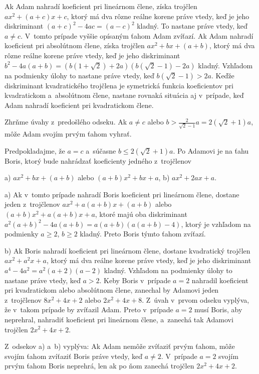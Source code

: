 {%
Ak Adam nahradí koeficient pri lineárnom člene, získa trojčlen
$ax^2+({a+c})x+c$, ktorý má dva rôzne reálne korene práve vtedy, keď je jeho
diskriminant $(a+c)^2-4ac=(a-c)^2$ kladný. To nastane práve vtedy, keď $a\ne
c$. V~tomto prípade vyššie opísaným ťahom Adam zvíťazí.
Ak Adam nahradí koeficient pri absolútnom člene, získa trojčlen
$ax^2+bx+(a+b)$, ktorý má dva rôzne reálne korene práve vtedy, keď je jeho diskriminant
$b^2-4a(a+b)=\left(b(1+\sqrt2)+2a\right)\left(b(\sqrt2-1)-2a\right)$
kladný. Vzhľadom na podmienky úlohy to nastane práve vtedy, keď
$b(\sqrt2-1)>2a$. Keďže diskriminant kvadratického trojčlena je symetrická
funkcia koeficientov pri kvadratickom a~absolútnom člene, nastane rovnaká
situácia aj v~prípade, keď Adam nahradí koeficient pri kvadratickom člene.

Zhrňme úvahy z~predošlého odseku. Ak $a\ne c$ alebo
$b>\frac2{\sqrt2-1}a=2(\sqrt2+1)a$, môže Adam svojím prvým ťahom vyhrať.

\smallskip
Predpokladajme, že $a=c$ a~súčasne $b\le 2(\sqrt2+1)a$. Po Adamovi je na
ťahu Boris, ktorý bude nahrádzať koeficienty jedného z~trojčlenov

\smallskip
{a)} $ax^2+bx+(a+b)$ alebo $(a+b)x^2+bx+a$,
\hfil
{b)} $ax^2+2ax+a$.

\smallskip
a) Ak v~tomto prípade nahradí Boris koeficient pri lineárnom člene,
dostane jeden z~trojčlenov $a x^2+a(a+b) x+(a+b)$ alebo
$(a+b)x^2+a(a+b) x +a$, ktoré majú oba diskriminant
$a^2(a+b)^2-4a(a+b)=a(a+b)\left(a(a+b)-4\right)$, ktorý je vzhľadom
na podmienky $a\ge2$, $b\ge2$ kladný. Preto Boris týmto ťahom zvíťazí.

b) Ak Boris nahradí koeficient pri lineárnom člene, dostane kvadratický
trojčlen $ax^2+a^2x+a$, ktorý má dva reálne korene práve vtedy,
keď je jeho diskriminant $a^4-4a^2=a^2(a+2)(a-2)$ kladný. Vzhľadom
na podmienky úlohy to nastane práve vtedy, keď $a>2$. Keby Boris v~prípade $a=2$
nahradil koeficient pri kvadratickom alebo absolútnom člene, zanechal by
Adamovi jeden z~trojčlenov $8x^2+4x+2$ alebo $2x^2+4x+8$. Z~úvah v~prvom
odseku vyplýva, že v~takom prípade by zvíťazil Adam. Preto v~prípade $a=2$
musí Boris, aby neprehral, nahradiť koeficient pri lineárnom člene, a~zanechá tak Adamovi
trojčlen $2x^2+4x+2$.

Z~odsekov a) a~b) vyplýva: Ak Adam nemôže zvíťaziť prvým ťahom, môže svojím
ťahom zvíťaziť Boris práve vtedy, keď $a\ne 2$. V~prípade $a=2$ svojím prvým ťahom Boris
neprehrá, len ak po ňom zanechá trojčlen $2x^2+4x+2$.

}
